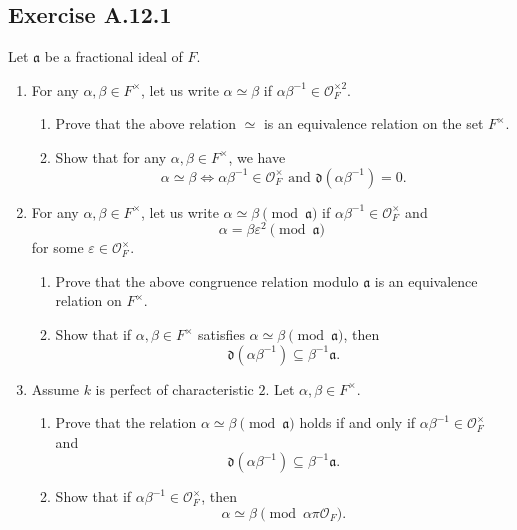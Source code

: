 \documentclass[12pt, a4paper]{article}
\begin{document}
\subsection*{Exercise A.12.1} Let $\mathfrak a$ be a fractional ideal of $F$. 
\begin{enumerate} 
    \item For any $\alpha,\beta\in F^\times$, let us write $\alpha\simeq \beta$ if $\alpha\beta^{-1}\in \mathcal O_F^{\times 2}$. 
        \begin{enumerate} 
            \item Prove that the above relation $\simeq$ is an equivalence relation on the set $F^\times$. 
            \item Show that for any $\alpha,\beta\in F^\times$, we have \[ \alpha\simeq \beta \Longleftrightarrow \alpha\beta^{-1}\in \mathcal O_F^\times \text{ and } \mathfrak d(\alpha\beta^{-1})=0. \] 
        \end{enumerate} 
        \item For any $\alpha,\beta\in F^\times$, let us write $\alpha\simeq \beta \pmod{\mathfrak a}$ if $\alpha\beta^{-1}\in \mathcal O_F^\times$ and \[ \alpha=\beta\varepsilon^2 \pmod{\mathfrak a} \] for some $\varepsilon\in \mathcal O_F^\times$. 
            \begin{enumerate} 
                \item Prove that the above congruence relation modulo $\mathfrak a$ is an equivalence relation on $F^\times$. 
                \item Show that if $\alpha,\beta\in F^\times$ satisfies $\alpha\simeq \beta\pmod{\mathfrak a}$, then \[ \mathfrak d(\alpha\beta^{-1})\subseteq \beta^{-1}\mathfrak a. \] 
            \end{enumerate} 
        \item Assume $k$ is perfect of characteristic $2$. Let $\alpha,\beta\in F^\times$. 
            \begin{enumerate} 
                \item Prove that the relation $\alpha\simeq \beta\pmod{\mathfrak a}$ holds if and only if $\alpha\beta^{-1}\in \mathcal O_F^\times$ and \[ \mathfrak d(\alpha\beta^{-1})\subseteq \beta^{-1}\mathfrak a. \] 
                \item Show that if $\alpha\beta^{-1}\in \mathcal O_F^\times$, then \[ \alpha\simeq \beta \pmod{\alpha\pi\mathcal O_F}. \] 
            \end{enumerate} 
\end{enumerate}
\end{document}
